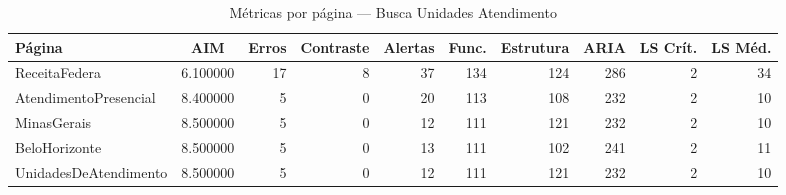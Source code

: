 \begin{table}[htbp]
  \centering
  \caption{Métricas por página — Busca Unidades Atendimento}
  \label{tab:flow_busca_unidades_atendimento}
  \small
  \begin{tabular}{lcrrrrrrrr}
\toprule
Página & AIM & Erros & Contraste & Alertas & Func. & Estrutura & ARIA & LS Crít. & LS Méd. \\
\midrule
ReceitaFedera & 6.100000 & 17 & 8 & 37 & 134 & 124 & 286 & 2 & 34 \\
AtendimentoPresencial & 8.400000 & 5 & 0 & 20 & 113 & 108 & 232 & 2 & 10 \\
MinasGerais & 8.500000 & 5 & 0 & 12 & 111 & 121 & 232 & 2 & 10 \\
BeloHorizonte & 8.500000 & 5 & 0 & 13 & 111 & 102 & 241 & 2 & 11 \\
UnidadesDeAtendimento & 8.500000 & 5 & 0 & 12 & 111 & 121 & 232 & 2 & 10 \\
\bottomrule
\end{tabular}
\end{table}
